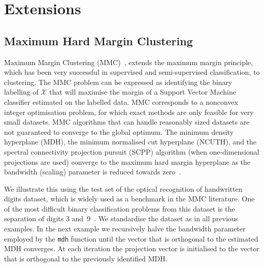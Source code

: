 \documentclass{book}
\begin{document}
\chapter{Extensions}


\section{Maximum Hard Margin Clustering}\label{sec:mmc}

Maximum Margin Clustering (MMC)~\cite{XuNLS2004}, extends the maximum margin
principle, which has been very successful in supervised and semi-supervised
classification, to clustering.
%
The MMC problem can be expressed as identifying the binary labelling of
$\mathcal{X}$ that will maximise the margin of a Support Vector Machine
classifier estimated on the labelled data. MMC corresponds to a nonconvex
integer optimisation problem, for which
%
exact methods are only feasible for very small datasets.
%
MMC algorithms that can handle reasonably sized datasets are not guaranteed to
converge to the global optimum.
%
The minimum density hyperplane (MDH), the minimum normalised cut hyperplane
(NCUTH), and the spectral connectivity projection pursuit (SCPP) algorithm
(when one-dimensional projections are used) converge to the maximum hard margin
hyperplane as the bandwidth (scaling) parameter is reduced towards
zero~\cite{PavlidisHT2016,Hofmeyr2017,HofmeyrPE2018}. 


We illustrate this using the test set of the optical recognition of handwritten
digits dataset, which is widely used as a benchmark in the MMC literature.  One
of the most difficult binary classification problems from this dataset is the
separation of digits 3 and~9~\cite[Table IV]{ZhangTK2009}. We standardise the
dataset as in all previous examples.  In the next example we recursively halve
the bandwidth parameter employed by the {\tt mdh} function until the vector
that is orthogonal to the estimated MDH converges.  At each iteration the
projection vector is initialised to the vector that is orthogonal to the
previously identified MDH. 
\end{document}
